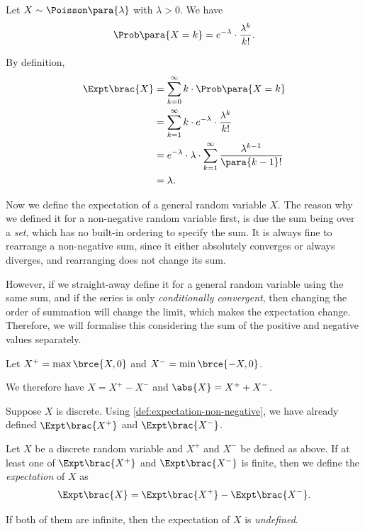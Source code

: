 \begin{example}
    \label{ex:expectation-poisson}%
    Let \(X \sim \Poisson\para{\lambda}\) with \(\lambda > 0\). We have
    \[
        \Prob\para{X = k} = e^{-\lambda} \cdot \frac{\lambda^k}{k!}.
    \]

    By definition,
    \begin{align*}
        \Expt\brac{X} &= \sum_{k = 0}^{\infty} k \cdot \Prob\para{X = k} \\
        &= \sum_{k = 1}^{\infty} k \cdot e^{-\lambda} \cdot \frac{\lambda^k}{k!} \\
        &= e^{-\lambda} \cdot \lambda \cdot \sum_{k = 1}^{\infty} \frac{\lambda^{k - 1}}{\para{k - 1}!} \\
        &=\lambda.
    \end{align*}
\end{example}

Now we define the expectation of a general random variable \(X\). The reason why we defined it for a non-negative random variable first, is due the sum being over a \emph{set}, which has no built-in ordering to specify the sum. It is always fine to rearrange a non-negative sum, since it either absolutely converges or always diverges, and rearranging does not change its sum.

However, if we straight-away define it for a general random variable using the same sum, and if the series is only \emph{conditionally convergent}, then changing the order of summation will change the limit, which makes the expectation change. Therefore, we will formalise this considering the sum of the positive and negative values separately.

Let \(X^+ = \max\brce{X, 0}\) and \(X^- = \min\brce{-X, 0}\).

We therefore have \(X = X^+ - X^-\) and \(\abs{X} = X^+ + X^-\).

Suppose \(X\) is discrete. Using \autoref{def:expectation-non-negative}, we have already defined \(\Expt\brac{X^+}\) and \(\Expt\brac{X^-}\).

\begin{definition}
    \label{def:expectation-general-random-variable}%
    Let \(X\) be a discrete random variable and \(X^+\) and \(X^-\) be defined as above. If at least one of \(\Expt\brac{X^+}\) and \(\Expt\brac{X^-}\) is finite, then we define the \emph{expectation} of \(X\) as
    \[
        \Expt\brac{X} = \Expt\brac{X^+} - \Expt\brac{X^-}.
    \]

    If both of them are infinite, then the expectation of \(X\) is \emph{undefined}.
\end{definition}

